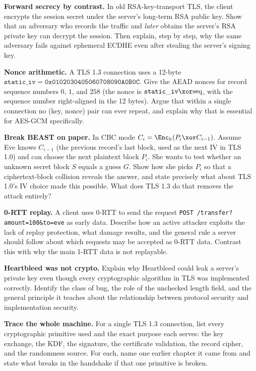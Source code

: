 \begin{exercise}
\textbf{Forward secrecy by contrast.} In old RSA-key-transport TLS, the client
encrypts the session secret under the server's long-term RSA public key. Show that
an adversary who records the traffic and \emph{later} obtains the server's RSA
private key can decrypt the session. Then explain, step by step, why the same
adversary fails against ephemeral ECDHE even after stealing the server's signing
key.
\end{exercise}

\begin{exercise}
\textbf{Nonce arithmetic.} A TLS 1.3 connection uses a 12-byte
$\mathtt{static\_iv} = \mathtt{0x0102030405060708090A0B0C}$. Give the AEAD nonces
for record sequence numbers $0$, $1$, and $258$ (the nonce is
$\mathtt{static\_iv} \xor \text{seq}$, with the sequence number right-aligned in
the 12 bytes). Argue that within a single connection no (key, nonce) pair can ever
repeat, and explain why that is essential for AES-GCM specifically.
\end{exercise}

\begin{exercise}
\textbf{Break BEAST on paper.} In CBC mode $C_i = \Enc_k(P_i \xor C_{i-1})$.
Assume Eve knows $C_{i-1}$ (the previous record's last block, used as the next IV
in TLS 1.0) and can choose the next plaintext block $P_i$. She wants to test
whether an unknown secret block $S$ equals a guess $G$. Show how she picks $P_i$ so
that a ciphertext-block collision reveals the answer, and state precisely what
about TLS 1.0's IV choice made this possible. What does TLS 1.3 do that removes the
attack entirely?
\end{exercise}

\begin{exercise}
\textbf{0-RTT replay.} A client uses 0-RTT to send the request
\texttt{POST /transfer?amount=100\&to=eve} as early data. Describe how an active
attacker exploits the lack of replay protection, what damage results, and the
general rule a server should follow about which requests may be accepted as 0-RTT
data. Contrast this with why the main 1-RTT data is not replayable.
\end{exercise}

\begin{exercise}
\textbf{Heartbleed was not crypto.} Explain why Heartbleed could leak a server's
private key even though every cryptographic algorithm in TLS was implemented
correctly. Identify the class of bug, the role of the unchecked length field, and
the general principle it teaches about the relationship between protocol security
and implementation security.
\end{exercise}

\begin{exercise}
\textbf{Trace the whole machine.} For a single TLS 1.3 connection, list every
cryptographic primitive used and the exact purpose each serves: the key exchange,
the KDF, the signature, the certificate validation, the record cipher, and the
randomness source. For each, name one earlier chapter it came from and state what
breaks in the handshake if that one primitive is broken.
\end{exercise}
